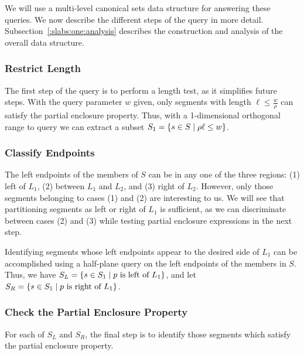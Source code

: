 We will use a multi-level canonical sets data structure 
\cite{chan2012} for answering these queries. 
We now describe the different steps of the query in more detail. 
Subsection~\ref{:slabs:one:analysis} describes the construction 
and analysis of the overall data structure.


\subsubsection{Restrict Length}
The first step of the query is to perform a length test, as it 
simplifies future steps. With the query parameter $w$ given, 
only segments with length $\ell \leq \frac{w}{\rho}$ can satisfy 
the partial enclosure property. Thus, with a 1-dimensional 
orthogonal range to query we can extract a subset 
$S_1 = \{ s\in S \;|\; \rho \ell \leq w \}$.


\subsubsection{Classify Endpoints}
The left endpoints of the members of $S$ can be in any one of the three 
regions: (1) left of $L_1$, (2) between $L_1$ and $L_2$, and (3) right 
of $L_2$. However, only those segments belonging to cases (1) and (2) 
are interesting to us. We will see that partitioning segments as left 
or right of $L_1$ is sufficient, as we can discriminate between cases 
(2) and (3) while testing partial enclosure expressions in the next step.

Identifying segments whose left endpoints appear to the desired side of 
$L_1$ can be accomplished using a half-plane query on the left endpoints 
of the members in $S$. Thus, we have $S_L = \{ s \in S_1 \;|\; p \text{ is 
left of } L_1 \}$, and let $S_R = \{ s \in S_1 \;|\; p \text{ is right of 
} L_1 \}$.


\subsubsection{Check the Partial Enclosure Property}
For each of $S_L$ and $S_R$, the final step is to identify those segments 
which satisfy the partial enclosure property.

